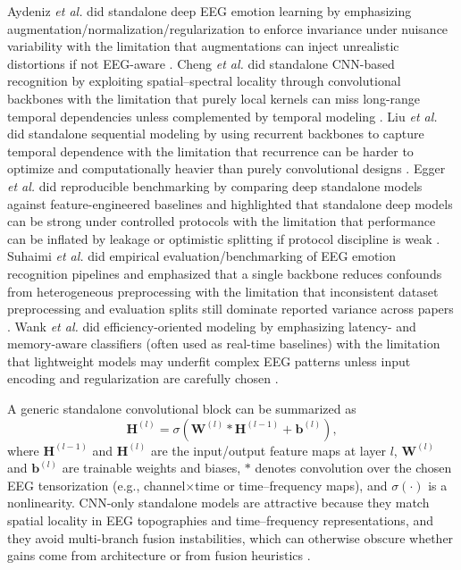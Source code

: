 \documentclass{WileyMSP-template}
\begin{document}
Aydeniz \textit{et al.} did standalone deep EEG emotion learning by emphasizing augmentation/normalization/regularization to enforce invariance under nuisance variability with the limitation that augmentations can inject unrealistic distortions if not EEG-aware \cite{saydn2020deeplear}. Cheng \textit{et al.} did standalone CNN-based recognition by exploiting spatial--spectral locality through convolutional backbones with the limitation that purely local kernels can miss long-range temporal dependencies unless complemented by temporal modeling \cite{jcheng2021emotionr}. Liu \textit{et al.} did standalone sequential modeling by using recurrent backbones to capture temporal dependence with the limitation that recurrence can be harder to optimize and computationally heavier than purely convolutional designs \cite{sliuxw2020subjecti}. Egger \textit{et al.} did reproducible benchmarking by comparing deep standalone models against feature-engineered baselines and highlighted that standalone deep models can be strong under controlled protocols with the limitation that performance can be inflated by leakage or optimistic splitting if protocol discipline is weak \cite{megger2019emotionr}. Suhaimi \textit{et al.} did empirical evaluation/benchmarking of EEG emotion recognition pipelines and emphasized that a single backbone reduces confounds from heterogeneous preprocessing with the limitation that inconsistent dataset preprocessing and evaluation splits still dominate reported variance across papers \cite{nssuha2020eegbased}. Wank \textit{et al.} did efficiency-oriented modeling by emphasizing latency- and memory-aware classifiers (often used as real-time baselines) with the limitation that lightweight models may underfit complex EEG patterns unless input encoding and regularization are carefully chosen \cite{sbwank2019ikknpred}.

A generic standalone convolutional block can be summarized as
\begin{equation}
\mathbf{H}^{(l)}=\sigma\!\left(\mathbf{W}^{(l)} * \mathbf{H}^{(l-1)}+\mathbf{b}^{(l)}\right),
\end{equation}
where $\mathbf{H}^{(l-1)}$ and $\mathbf{H}^{(l)}$ are the input/output feature maps at layer $l$, $\mathbf{W}^{(l)}$ and $\mathbf{b}^{(l)}$ are trainable weights and biases, $*$ denotes convolution over the chosen EEG tensorization (e.g., channel$\times$time or time--frequency maps), and $\sigma(\cdot)$ is a nonlinearity. CNN-only standalone models are attractive because they match spatial locality in EEG topographies and time--frequency representations, and they avoid multi-branch fusion instabilities, which can otherwise obscure whether gains come from architecture or from fusion heuristics \cite{sliuxw2020subjecti}.
\end{document}
